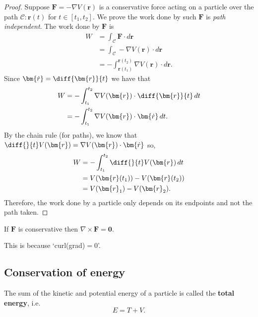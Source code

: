 \documentclass[12pt, a4paper]{article}
\begin{document}
\begin{proof}
    Suppose \(\bm{F}=-\nabla V(\bm{r})\) is a conservative force acting on a particle over the path \(\mathcal{C} : \bm{r}(t)\) for \(t \in [t_1,t_2]\).  We prove the work done by such \(\bm{F}\) is \textit{path independent}. The work done by \(\bm{F}\) is 
    \[\begin{aligned}
        W &= \int_{\mathcal{C}} \bm{F} \cdot d\bm{r}\\
        &= \int_{\mathcal{C}} - \nabla V(\bm{r}) \cdot d\bm{r} \\
        &= - \int_{\bm{r}(t_1)}^{\bm{r}(t_2)} \nabla V(\bm{r}) \cdot d\bm{r}.
    \end{aligned}\]
    Since \(\bm{\dot{r}} = \diff{\bm{r}}{t}\) we have that 
    \[\begin{aligned}
        W &= - \int_{t_1}^{t_2} \nabla V(\bm{r}) \cdot \diff{\bm{r}}{t} \, dt \\
        &= - \int_{t_1}^{t_2} \nabla V(\bm{r}) \cdot \bm{\dot{r}} \, dt.
    \end{aligned}\]
    By the chain rule (for paths), we know that \(\diff{}{t} V(\bm{r}) = \nabla V(\bm{r}) \cdot \bm{\dot{r}}\) so,
    \[\begin{aligned}
        W &= - \int_{t_1}^{t_2} \diff{}{t} V(\bm{r}) \, dt \\
        &= V(\bm{r}(t_1)) -V(\bm{r}(t_2)) \\
        &=V(\bm{r}_1)-V(\bm{r}_2).
    \end{aligned}\]
    Therefore, the work done by a particle only depends on its endpoints and not the path taken.
\end{proof}

\begin{mdthm}
    If \(\bm{F}\) is conservative then \(\nabla \times \bm{F}=\bm{0}\).
\end{mdthm}

\begin{mdnote}
    This is because `curl(grad)\(=0\)'.
\end{mdnote}

\subsection{Conservation of energy}

\begin{definition}
    The sum of the kinetic and potential energy of a particle is called the \textbf{total energy}, i.e.
    \[E=T+V.\]
\end{definition}
\end{document}
